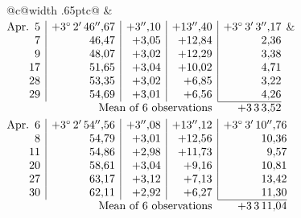 \noindent\begin{tabular}{@{}c@{\hspace{.4em}\vrule width .65pt\hspace{.4em}}c@{}}
 &
 \\[.18ex]
\(\begin{array}[t]{@{}r|r|r|r|r@{}}
\text{Apr.}\enspace 5 & +3^\circ\,2'\,46''{,}67 & +3''{,}10 & +13''{,}40 & +3^\circ\,3'\,3''{,}17\\
7 & 46{,}47 & +3{,}05 & +12{,}84 & 2{,}36\\
9 & 48{,}07 & +3{,}02 & +12{,}29 & 3{,}38\\
17 & 51{,}65 & +3{,}04 & +10{,}02 & 4{,}71\\
28 & 53{,}35 & +3{,}02 & +6{,}85 & 3{,}22\\
29 & 54{,}69 & +3{,}01 & +6{,}56 & 4{,}26\\
\cline{5-5}
\multicolumn{4}{r}{\text{Mean of 6 observations}} & +3\,3\,3{,}52
\end{array}\)
&
\(\begin{array}[t]{@{}r|r|r|r|r@{}}
\text{Apr.}\enspace 6 & +3^\circ\,2'\,54''{,}56 & +3''{,}08 & +13''{,}12 & +3^\circ\,3'\,10''{,}76\\
8 & 54{,}79 & +3{,}01 & +12{,}56 & 10{,}36\\
11 & 54{,}86 & +2{,}98 & +11{,}73 & 9{,}57\\
20 & 58{,}61 & +3{,}04 & +9{,}16 & 10{,}81\\
27 & 63{,}17 & +3{,}12 & +7{,}13 & 13{,}42\\
30 & 62{,}11 & +2{,}92 & +6{,}27 & 11{,}30\\
\cline{5-5}
\multicolumn{4}{r}{\text{Mean of 6 observations}} & +3\,3\,11{,}04
\end{array}\)
\end{tabular}\par\medskip
